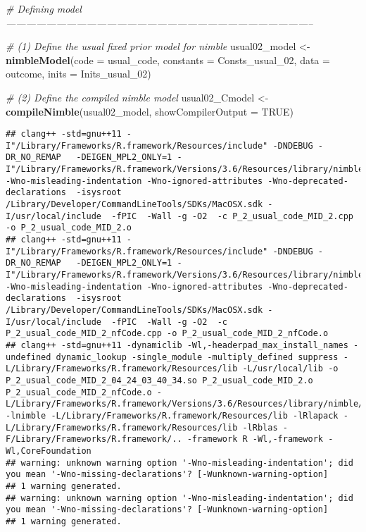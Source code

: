 \documentclass[]{article}
\newenvironment{Shaded}{\begin{snugshade}}{\end{snugshade}}
\newcommand{\CommentTok}[1]{\textcolor[rgb]{0.56,0.35,0.01}{\textit{#1}}}
\newcommand{\DataTypeTok}[1]{\textcolor[rgb]{0.13,0.29,0.53}{#1}}
\newcommand{\DecValTok}[1]{\textcolor[rgb]{0.00,0.00,0.81}{#1}}
\newcommand{\KeywordTok}[1]{\textcolor[rgb]{0.13,0.29,0.53}{\textbf{#1}}}
\newcommand{\NormalTok}[1]{#1}
\newcommand{\OtherTok}[1]{\textcolor[rgb]{0.56,0.35,0.01}{#1}}
\newcommand{\StringTok}[1]{\textcolor[rgb]{0.31,0.60,0.02}{#1}}
\begin{document}
\begin{Shaded}
\begin{Highlighting}[]
\CommentTok{# Defining model --------------------------------------------------------------------------------------------}

\CommentTok{# (1) Define the usual fixed prior model for nimble}
\NormalTok{usual02_model <-}\StringTok{ }\KeywordTok{nimbleModel}\NormalTok{(}\DataTypeTok{code =}\NormalTok{ usual_code, }\DataTypeTok{constants =}\NormalTok{ Consts_usual_}\DecValTok{02}\NormalTok{, }\DataTypeTok{data =}\NormalTok{ outcome, }\DataTypeTok{inits =}\NormalTok{ Inits_usual_}\DecValTok{02}\NormalTok{)}

\CommentTok{# (2) Define the compiled nimble model}
\NormalTok{usual02_Cmodel <-}\StringTok{ }\KeywordTok{compileNimble}\NormalTok{(usual02_model, }\DataTypeTok{showCompilerOutput =} \OtherTok{TRUE}\NormalTok{)      }
\end{Highlighting}
\end{Shaded}

\begin{verbatim}
## clang++ -std=gnu++11 -I"/Library/Frameworks/R.framework/Resources/include" -DNDEBUG -DR_NO_REMAP   -DEIGEN_MPL2_ONLY=1 -I"/Library/Frameworks/R.framework/Versions/3.6/Resources/library/nimble/include" -Wno-misleading-indentation -Wno-ignored-attributes -Wno-deprecated-declarations  -isysroot /Library/Developer/CommandLineTools/SDKs/MacOSX.sdk -I/usr/local/include  -fPIC  -Wall -g -O2  -c P_2_usual_code_MID_2.cpp -o P_2_usual_code_MID_2.o
## clang++ -std=gnu++11 -I"/Library/Frameworks/R.framework/Resources/include" -DNDEBUG -DR_NO_REMAP   -DEIGEN_MPL2_ONLY=1 -I"/Library/Frameworks/R.framework/Versions/3.6/Resources/library/nimble/include" -Wno-misleading-indentation -Wno-ignored-attributes -Wno-deprecated-declarations  -isysroot /Library/Developer/CommandLineTools/SDKs/MacOSX.sdk -I/usr/local/include  -fPIC  -Wall -g -O2  -c P_2_usual_code_MID_2_nfCode.cpp -o P_2_usual_code_MID_2_nfCode.o
## clang++ -std=gnu++11 -dynamiclib -Wl,-headerpad_max_install_names -undefined dynamic_lookup -single_module -multiply_defined suppress -L/Library/Frameworks/R.framework/Resources/lib -L/usr/local/lib -o P_2_usual_code_MID_2_04_24_03_40_34.so P_2_usual_code_MID_2.o P_2_usual_code_MID_2_nfCode.o -L/Library/Frameworks/R.framework/Versions/3.6/Resources/library/nimble/CppCode -lnimble -L/Library/Frameworks/R.framework/Resources/lib -lRlapack -L/Library/Frameworks/R.framework/Resources/lib -lRblas -F/Library/Frameworks/R.framework/.. -framework R -Wl,-framework -Wl,CoreFoundation
## warning: unknown warning option '-Wno-misleading-indentation'; did you mean '-Wno-missing-declarations'? [-Wunknown-warning-option]
## 1 warning generated.
## warning: unknown warning option '-Wno-misleading-indentation'; did you mean '-Wno-missing-declarations'? [-Wunknown-warning-option]
## 1 warning generated.
\end{verbatim}
\end{document}
